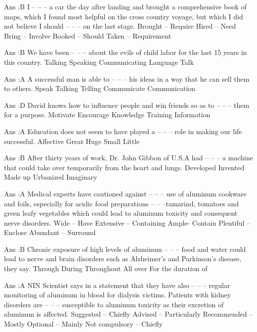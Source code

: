     Ans :B
    I -- -- -- a car the day after landing and brought a comprehensive book of maps, which I found most helpful on the cross country voyage, but which I did not believe I should -- -- -- on the last stage.
        Brought – Require
        Hired – Need
        Bring – Involve
        Booked – Should
        Taken – Requirement 

    Ans :B
    We have been -- -- -- about the evils of child labor for the last 15 years in this country.
        Talking
        Speaking
        Communicating
        Language
        Talk 

    Ans :A
    A successful man is able to -- -- -- his ideas in a way that he can sell them to others.
        Speak
        Talking
        Telling
        Communicate
        Communication 

    Ans :D
    David knows how to influence people and win friends so as to -- -- -- them for a purpose.
        Motivate
        Encourage
        Knowledge
        Training
        Information 

    Ans :A
    Education does not seem to have played a -- -- -- role in making our life successful.
        Affective
        Great
        Huge
        Small
        Little 

    Ans :B
    After thirty years of work, Dr. John Gibbon of U.S.A had -- -- -- a machine that could take over temporarily from the heart and lungs.
        Developed
        Invented
        Made up
        Urbanized
        Imaginary 

    Ans :A
    Medical experts have cautioned against -- -- -- use of aluminum cookware and foils, especially for acidic food preparations -- -- --tamarind, tomatoes and green leafy vegetables which could lead to aluminum toxicity and consequent nerve disorders.
        Wide – Have
        Extensive – Containing
        Ample- Contain
        Plentiful – Enclose
        Abundant – Surround 

    Ans :B
    Chronic exposure of high levels of aluminum -- -- -- food and water could lead to nerve and brain disorders such as Alzheimer’s and Parkinson’s disease, they say.
        Through
        During
        Throughout
        All over
        For the duration of 

    Ans :A
    NIN Scientist says in a statement that they have also -- -- -- regular monitoring of aluminum in blood for dialysis victims. Patients with kidney disorders are -- -- -- susceptible to aluminum toxicity as their excretion of aluminum is affected.
        Suggested – Chiefly
        Advised – Particularly
        Recommended – Mostly
        Optional – Mainly
        Not compulsory – Chiefly 

